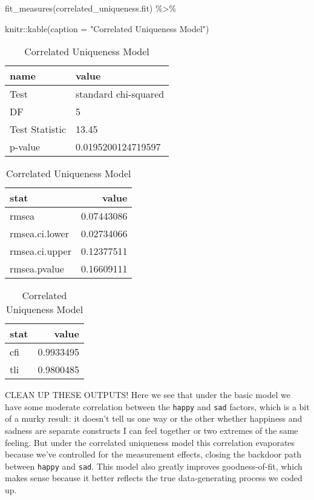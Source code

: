 \documentclass[
  letterpaper,
  DIV=11,
  numbers=noendperiod]{scrreprt}
\newenvironment{Shaded}{\begin{snugshade}}{\end{snugshade}}
\newcommand{\AttributeTok}[1]{\textcolor[rgb]{0.40,0.45,0.13}{#1}}
\newcommand{\FunctionTok}[1]{\textcolor[rgb]{0.28,0.35,0.67}{#1}}
\newcommand{\NormalTok}[1]{\textcolor[rgb]{0.00,0.23,0.31}{#1}}
\newcommand{\SpecialCharTok}[1]{\textcolor[rgb]{0.37,0.37,0.37}{#1}}
\newcommand{\StringTok}[1]{\textcolor[rgb]{0.13,0.47,0.30}{#1}}
\begin{document}
\begin{Shaded}
\begin{Highlighting}[]
\FunctionTok{fit\_measures}\NormalTok{(correlated\_uniqueness.fit) }\SpecialCharTok{\%\textgreater{}\%} 
  
\NormalTok{  knitr}\SpecialCharTok{::}\FunctionTok{kable}\NormalTok{(}\AttributeTok{caption =} \StringTok{"Correlated Uniqueness Model"}\NormalTok{)}
\end{Highlighting}
\end{Shaded}

\begin{table}
\caption{Correlated Uniqueness Model}

\centering
\begin{tabular}[t]{l|l}
\hline
name & value\\
\hline
Test & standard chi-squared\\
\hline
DF & 5\\
\hline
Test Statistic & 13.45\\
\hline
p-value & 0.0195200124719597\\
\hline
\end{tabular}
\centering
\begin{tabular}[t]{l|r}
\hline
stat & value\\
\hline
rmsea & 0.07443086\\
\hline
rmsea.ci.lower & 0.02734066\\
\hline
rmsea.ci.upper & 0.12377511\\
\hline
rmsea.pvalue & 0.16609111\\
\hline
\end{tabular}
\centering
\begin{tabular}[t]{l|r}
\hline
stat & value\\
\hline
cfi & 0.9933495\\
\hline
tli & 0.9800485\\
\hline
\end{tabular}
\end{table}

CLEAN UP THESE OUTPUTS! Here we see that under the basic model we have
some moderate correlation between the \texttt{happy} and \texttt{sad}
factors, which is a bit of a murky result: it doesn't tell us one way or
the other whether happiness and sadness are separate constructs I can
feel together or two extremes of the same feeling. But under the
correlated uniqueness model this correlation evaporates because we've
controlled for the measurement effects, closing the backdoor path
between \texttt{happy} and \texttt{sad}. This model also greatly
improves goodness-of-fit, which makes sense because it better reflects
the true data-generating process we coded up.
\end{document}
